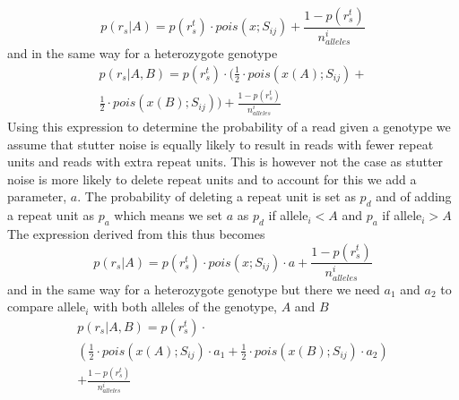 \documentclass{bioinfo}
\begin{document}
\begin{methods}
\begin{equation}
p(r_s|A) = p(r^t_s) \cdot pois(x;S_{ij}) + \frac{1-p(r^t_s)}{n^i_{alleles}}
\label{eq:likelihood2}
\end{equation}
and in the same way for a heterozygote genotype 
\begin{multline}
p(r_s|A,B) = p(r^t_s) \cdot (\frac{1}{2} \cdot pois(x(A);S_{ij})+ \\
\frac{1}{2} \cdot pois(x(B);S_{ij})) + \frac{1-p(r^t_s)}{n^i_{alleles}}
\end{multline}
Using this expression to determine the probability of a read given a genotype we assume that stutter noise is equally likely to result in reads with fewer repeat units and reads with extra repeat units. This is however not the case as stutter noise is more likely to delete repeat units and to account for this we add a parameter, $a$. The probability of deleting a repeat unit is set as $p_d$ and of adding a repeat unit as $p_a$ which means we set $a$ as $p_d$ if allele$_i < A$ and $p_a$ if allele$_i > A$ The expression derived from this thus becomes 
\begin{equation}
p(r_s|A) = p(r^t_s) \cdot pois(x;S_{ij}) \cdot a + \frac{1-p(r^t_s)}{n^i_{alleles}}
\label{eq:likelihood3}
\end{equation}
and in the same way for a heterozygote genotype but there we need $a_1$ and $a_2$ to compare allele$_i$ with both alleles of the genotype, $A$ and $B$
\begin{multline}
p(r_s|A,B) = p(r^t_s) \cdot \\
(\frac{1}{2} \cdot pois(x(A);S_{ij}) \cdot a_1+ \frac{1}{2} \cdot pois(x(B);S_{ij})\cdot a_2)\\
+ \frac{1-p(r^t_s)}{n^i_{alleles}}
\label{eq:likelihood3.5}
\end{multline}


\end{methods}
\end{document}
